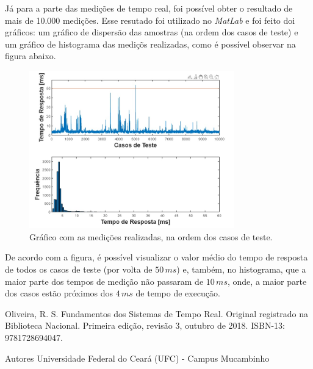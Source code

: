 \documentclass[journal]{IEEEtran}
\begin{document}
Já para a parte das medições de tempo real, foi possível obter o resultado de mais de 10.000 medições. Esse
resutado foi utilizado no \textit{MatLab} e foi feito doi gráficos: um gráfico de dispersão das amostras (na
ordem dos casos de teste) e um gráfico de histograma das mediçõs realizadas, como é possível observar na 
figura abaixo.

\begin{figure}[h]
	\centering
	\includegraphics[width=3.5in]{Imagens/resultado.jpeg}	
	\caption{Gráfico com as medições realizadas, na ordem dos casos de teste.}
	\label{fig1}
\end{figure}

De acordo com a figura, é possível visualizar o valor médio do tempo de resposta de todos os casos de teste
(por volta de $50 \,ms$) e, também, no histograma, que a maior parte dos tempos de medição não passaram de 
$10 \,ms$, onde, a maior parte dos casos estão próximos dos $4 \,ms$ de tempo de execução.


\ifCLASSOPTIONcaptionsoff
  \newpage
\fi

\begin{thebibliography}{1}

Oliveira, R. S. Fundamentos dos Sistemas de Tempo Real. Original registrado na Biblioteca Nacional. Primeira edição, revisão 3, outubro de 2018. ISBN-13: 9781728694047.

\end{thebibliography}

\begin{IEEEbiography}{Autores}
Universidade Federal do Ceará (UFC) - Campus Mucambinho
\end{IEEEbiography}
\end{document}
